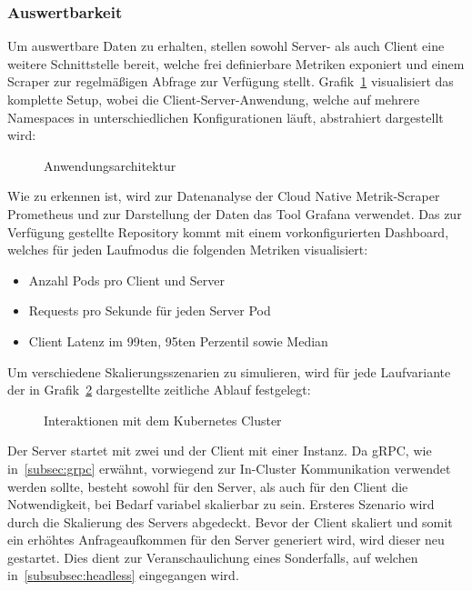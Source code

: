 \subsubsection{Auswertbarkeit}\label{subsubsec:auswertbarkeit}
Um auswertbare Daten zu erhalten, stellen sowohl Server- als auch Client eine weitere Schnittstelle bereit, welche frei definierbare Metriken exponiert und einem Scraper zur regelmäßigen Abfrage zur Verfügung stellt.
Grafik~\ref{fig:setup} visualisiert das komplette Setup, wobei die Client-Server-Anwendung, welche auf mehrere Namespaces in unterschiedlichen Konfigurationen läuft, abstrahiert dargestellt wird:

\begin{figure}[H]
    \centering
    
    \caption{Anwendungsarchitektur}
    \label{fig:setup}
\end{figure}

Wie zu erkennen ist, wird zur Datenanalyse der Cloud Native Metrik-Scraper Prometheus und zur Darstellung der Daten das Tool Grafana verwendet.
Das zur Verfügung gestellte Repository kommt mit einem vorkonfigurierten Dashboard, welches für jeden Laufmodus die folgenden Metriken visualisiert:
\begin{itemize}
    \item Anzahl Pods pro Client und Server
    \item Requests pro Sekunde für jeden Server Pod
    \item Client Latenz im 99ten, 95ten Perzentil sowie Median
\end{itemize}

Um verschiedene Skalierungsszenarien zu simulieren, wird für jede Laufvariante der in Grafik~\ref{fig:zeitablauf} dargestellte zeitliche Ablauf festgelegt:

\begin{figure}[H]
    \centering
    
    \caption{Interaktionen mit dem Kubernetes Cluster}
    \label{fig:zeitablauf}
\end{figure}

Der Server startet mit zwei und der Client mit einer Instanz.
Da gRPC, wie in~\ref{subsec:grpc} erwähnt, vorwiegend zur In-Cluster Kommunikation verwendet werden sollte, besteht sowohl für den Server, als auch für den Client die Notwendigkeit, bei Bedarf variabel skalierbar zu sein.
Ersteres Szenario wird durch die Skalierung des Servers abgedeckt.
Bevor der Client skaliert und somit ein erhöhtes Anfrageaufkommen für den Server generiert wird, wird dieser neu gestartet.
Dies dient zur Veranschaulichung eines Sonderfalls, auf welchen in~\ref{subsubsec:headless} eingegangen wird.

